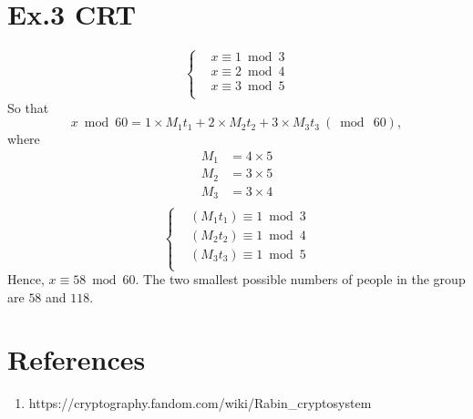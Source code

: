 \documentclass[a4paper]{article}
\begin{document}
\section*{Ex.3 CRT}
	$$
	\left\{
	\begin{aligned}
		&x \equiv 1 \bmod 3\\
		&x \equiv 2 \bmod 4\\
		&x \equiv 3 \bmod 5\\
	\end{aligned}
	\right.
	$$
	So that
	$$x \bmod 60 = 1 \times M_{1}t_{1} + 2 \times M_{2}t_{2} + 3 \times M_{3}t_{3}\ (\bmod\ 60),$$
	where
	$$
	\begin{aligned}
		M_{1} &= 4 \times 5\\
		M_{2} &= 3 \times 5\\
		M_{3} &= 3 \times 4\\
	\end{aligned}
	$$
	$$
	\left\{
	\begin{aligned}
		&(M_{1}t_{1}) \equiv 1 \bmod 3\\
		&(M_{2}t_{2}) \equiv 1 \bmod 4\\
		&(M_{3}t_{3}) \equiv 1 \bmod 5\\
	\end{aligned}
	\right.
	$$
	Hence, $x \equiv 58 \bmod 60$. The two smallest possible numbers of people in the group are $58$ and $118$.

\section*{References}
\begin{enumerate}
	\item https://cryptography.fandom.com/wiki/Rabin\_cryptosystem
\end{enumerate}
\end{document}
